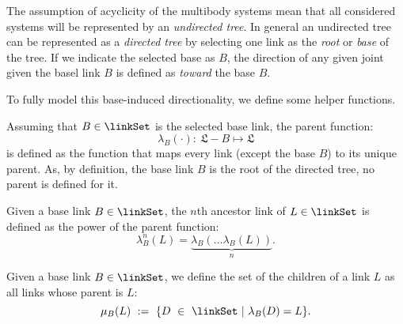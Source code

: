 

The assumption of acyclicity of the multibody systems mean that all considered systems will be represented by an \emph{undirected tree}. In general an undirected tree can be represented as a \emph{directed tree} by selecting one link as the \emph{root} or \emph{base} of the tree. If we indicate the selected base as $B$, the direction of any given joint given the basel link $B$ is defined as \emph{toward} the base $B$. 

To fully model this base-induced directionality, we define some helper functions. 

\begin{definition}
Assuming that $B \in \linkSet$ is the selected base link, the parent function:
\begin{equation}
    \lambda_B(\cdot) : \ \mathfrak{L} - B \mapsto \mathfrak{L} 
\end{equation}
is defined as the function that maps every link (except the base $B$) to its unique parent.
As, by definition, the base link $B$ is the root of the directed tree, no parent is defined for it.
\end{definition}

\begin{definition}
Given a base link $B \in \linkSet$, the $n$th ancestor link of $L \in \linkSet$ is defined as the power of the parent function:
\begin{equation}
    \lambda_B^n(L) = \underbrace{\lambda_B(\dots \lambda_B(L))}_n . 
\end{equation}
\end{definition}

\begin{definition}
Given a base link $B \in \linkSet$, we define the set of the children of a link $L$ as all links whose parent is $L$: 
\begin{equation}
    \mu_B(L) \ := \  \{ D \ \in \ \linkSet \ | \ \lambda_B(D) = L \}.
\end{equation}
\end{definition}

